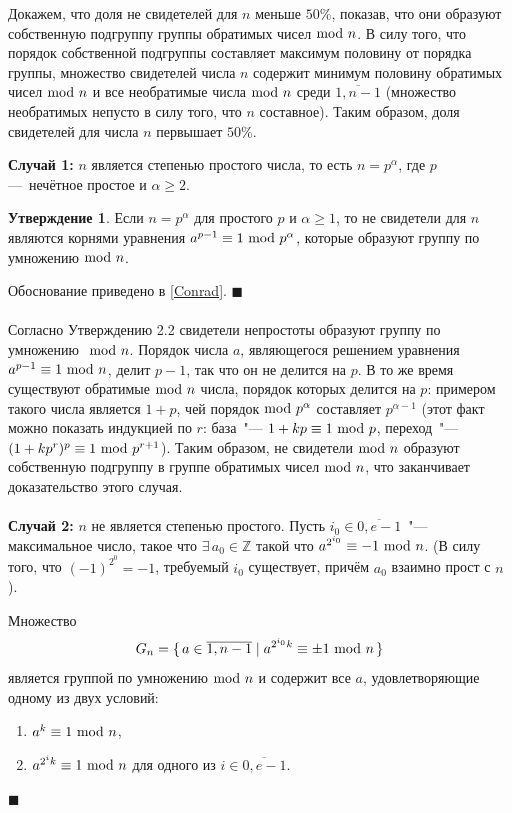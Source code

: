 \documentclass[12pt]{article}
\theoremstyle{definition}
\newtheorem{St}{Утверждение}
\numberwithin{Def}{section}
\numberwithin{Th}{section}
\numberwithin{St}{section}
\numberwithin{Cor}{section}
\newenvironment{Proof}                    
        {\par\noindent{\bf Доказательство.}}
        {\hfill$\scriptstyle\blacksquare$}
\newcommand{\Set}[2]{
  \{\, #1 \mid #2 \, \}
}
\begin{document}
\begin{Proof}
	Докажем, что доля не свидетелей для $n$ меньше $50\%$, показав, что они
	образуют собственную подгруппу группы обратимых чисел$\ \mathrm{mod}\ n$. В силу того,
	что порядок собственной подгруппы составляет максимум половину от порядка
	группы, множество свидетелей числа $n$ содержит минимум половину обратимых
	чисел$\ \mathrm{mod}\ n$ и все необратимые числа$\ \mathrm{mod}\ n$ среди $\overline{1,n-1}$
	(множество необратимых непусто в силу того, что $n$ составное).
	Таким образом, доля свидетелей для числа $n$ первышает $50\%$.
	
	\textbf{Случай 1:} $n$ является степенью простого числа,
	то есть $n=p^\alpha$, где $p$ — нечётное простое и $\alpha\geqslant 2$.
	
	\begin{St}
		Если $n=p^\alpha$ для простого $p$ и $\alpha\geqslant 1$, то
		не свидетели для $n$ являются корнями уравнения
		$a^{p-1}\equiv 1\ \mathrm{mod}\ p^\alpha$, которые образуют группу по
		умножению$\ \mathrm{mod}\ n$.
	\end{St}
	
	\begin{Proof}
		Обоснование приведено в \ref{Conrad}.
	\end{Proof}
	\\\\
	Согласно Утверждению 2.2 свидетели непростоты образуют группу по умножению
	$\ \mathrm{mod}\ n$. Порядок числа $a$, являющегося решением уравнения
	$a^{p-1}\equiv1\ \mathrm{mod}\ n$, делит $p-1$, так что он не делится на $p$. В то же
	время существуют обратимые$\ \mathrm{mod}\ n$ числа, порядок которых делится на $p$:
	примером такого числа является $1+p$, чей порядок$\ \mathrm{mod}\ p^\alpha$ составляет
	$p^{\alpha-1}$ (этот факт можно показать индукцией по $r$: база~"---
	$1+kp\equiv 1\ \mathrm{mod}\ p$, переход~"--- $(1+kp^r)^p\equiv 1\ \mathrm{mod}\ p^{r+1}$).
	Таким образом, не свидетели$\ \mathrm{mod}\ n$ образуют собственную подгруппу в группе
	обратимых чисел$\ \mathrm{mod}\ n$, что заканчивает доказательство этого случая.
	\\\\
	\textbf{Случай 2:} $n$ не является степенью простого. Пусть
	$i_0\in\overline{0,e-1}$~"--- максимальное число, такое что
	$\exists\,a_0\in\mathbb{Z}$ такой что $a^{2^{i_0}}\equiv-1\ \mathrm{mod}\ n$.
	(В силу того, что $(-1)^{2^0}=-1$, требуемый $i_0$ существует, причём
	$a_0$ взаимно прост с $n$).
		
	Множество
	$$
	G_n=\Set{a\in\overline{1,n-1}}{a^{2^{i_0}k}\equiv\pm1\Mod{n}}
	$$ 
	является группой по умножению$\ \mathrm{mod}\ n$ и содержит все $a$, удовлетворяющие
	одному из двух условий:
	\begin{enumerate}[(1)]
		\item $a^k\equiv 1\ \mathrm{mod}\ n$,
		\item $a^{2^ik}\equiv 1\ \mathrm{mod}\ n$ для одного из $i\in\overline{0,e-1}$.
	\end{enumerate}
	

\end{Proof}
\end{document}
